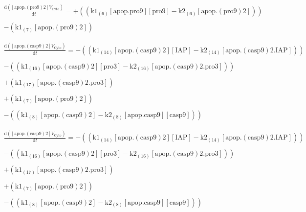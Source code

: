 \documentclass[a4paper,12pt]{article} %
\newcommand{\M}[1]{\mathrm{#1}}
\begin{document}
\begin{equation}
\begin{split}
\frac {\M{d}( {{\M{[apop.(pro9)2]}}    {V}_{\M{Cyto}} } ) }  {\M{d}{t} }  =  {  +  (( {{\M{k1}}_{\M{(6)}}    {\M{[apop.pro9]}}    {\M{[pro9]}}  -  {\M{k2}}_{\M{(6)}}    {\M{[apop.(pro9)2]}} } )) } \\ 
  \\ 
   {  -  ( {{\M{k1}}_{\M{(7)}}    {\M{[apop.(pro9)2]}} } ) } \end{split}
\end{equation}


\begin{equation}
\begin{split}
\frac {\M{d}( {{\M{[apop.(casp9)2]}}    {V}_{\M{Cyto}} } ) }  {\M{d}{t} }  =  {  -  (( {{\M{k1}}_{\M{(14)}}    {\M{[apop.(casp9)2]}}    {\M{[IAP]}}  -  {\M{k2}}_{\M{(14)}}    {\M{[apop.(casp9)2.IAP]}} } )) } \\ 
  \\ 
   {  -  (( {{\M{k1}}_{\M{(16)}}    {\M{[apop.(casp9)2]}}    {\M{[pro3]}}  -  {\M{k2}}_{\M{(16)}}    {\M{[apop.(casp9)2.pro3]}} } )) } \\ 
  \\ 
   {  +  ( {{\M{k1}}_{\M{(17)}}    {\M{[apop.(casp9)2.pro3]}} } ) } \\ 
  \\ 
   {  +  ( {{\M{k1}}_{\M{(7)}}    {\M{[apop.(pro9)2]}} } ) } \\ 
  \\ 
   {  -  (( {{\M{k1}}_{\M{(8)}}    {\M{[apop.(casp9)2]}}  -  {\M{k2}}_{\M{(8)}}    {\M{[apop.casp9]}}    {\M{[casp9]}} } )) } \end{split}
\end{equation}


\begin{equation}
\begin{split}
\frac {\M{d}( {{\M{[apop.(casp9)2]}}    {V}_{\M{Cyto}} } ) }  {\M{d}{t} }  =  {  -  (( {{\M{k1}}_{\M{(14)}}    {\M{[apop.(casp9)2]}}    {\M{[IAP]}}  -  {\M{k2}}_{\M{(14)}}    {\M{[apop.(casp9)2.IAP]}} } )) } \\ 
  \\ 
   {  -  (( {{\M{k1}}_{\M{(16)}}    {\M{[apop.(casp9)2]}}    {\M{[pro3]}}  -  {\M{k2}}_{\M{(16)}}    {\M{[apop.(casp9)2.pro3]}} } )) } \\ 
  \\ 
   {  +  ( {{\M{k1}}_{\M{(17)}}    {\M{[apop.(casp9)2.pro3]}} } ) } \\ 
  \\ 
   {  +  ( {{\M{k1}}_{\M{(7)}}    {\M{[apop.(pro9)2]}} } ) } \\ 
  \\ 
   {  -  (( {{\M{k1}}_{\M{(8)}}    {\M{[apop.(casp9)2]}}  -  {\M{k2}}_{\M{(8)}}    {\M{[apop.casp9]}}    {\M{[casp9]}} } )) } \end{split}
\end{equation}
\end{document}

